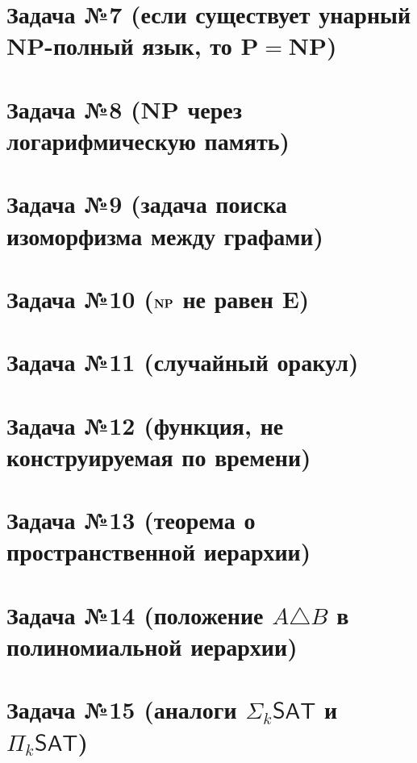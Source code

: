 \section{Задача №7 (если существует унарный $\mathbf{NP}$-полный язык, то $\mathbf{P} = \mathbf{NP}$)}


\section{Задача №8 ($\mathbf{NP}$ через логарифмическую память)}


\section{Задача №9 (задача поиска изоморфизма между графами)}


\section{Задача №10 ($\textbf{NP}$ не равен $\mathbf{E}$)}



\section{Задача №11 (случайный оракул)}



\section{Задача №12 (функция, не конструируемая по времени)}\label{notconstr}


\section{Задача №13 (теорема о пространственной иерархии)}\label{task:memory}

\section{Задача №14 (положение $A \triangle B$ в полиномиальной иерархии)}


\section{Задача №15 (аналоги $\Sigma_k\mathsf{SAT}$ и $\Pi_k\mathsf{SAT}$)}


